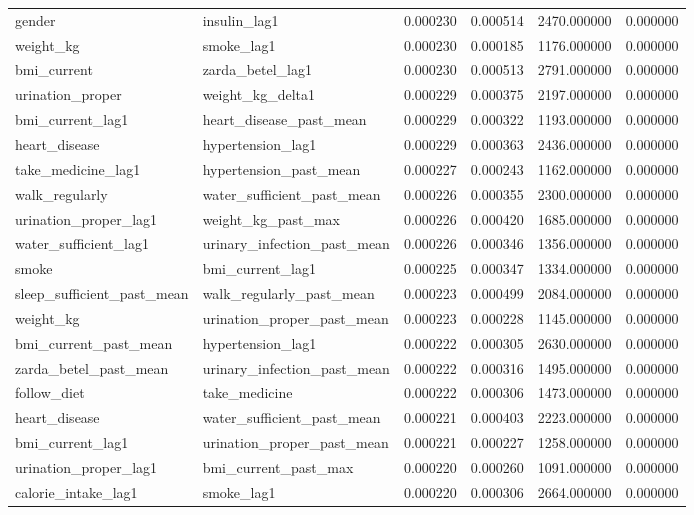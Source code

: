 \begin{longtable}{llrrrr}
gender & insulin\_lag1 & 0.000230 & 0.000514 & 2470.000000 & 0.000000 \\
weight\_kg & smoke\_lag1 & 0.000230 & 0.000185 & 1176.000000 & 0.000000 \\
bmi\_current & zarda\_betel\_lag1 & 0.000230 & 0.000513 & 2791.000000 & 0.000000 \\
urination\_proper & weight\_kg\_delta1 & 0.000229 & 0.000375 & 2197.000000 & 0.000000 \\
bmi\_current\_lag1 & heart\_disease\_past\_mean & 0.000229 & 0.000322 & 1193.000000 & 0.000000 \\
heart\_disease & hypertension\_lag1 & 0.000229 & 0.000363 & 2436.000000 & 0.000000 \\
take\_medicine\_lag1 & hypertension\_past\_mean & 0.000227 & 0.000243 & 1162.000000 & 0.000000 \\
walk\_regularly & water\_sufficient\_past\_mean & 0.000226 & 0.000355 & 2300.000000 & 0.000000 \\
urination\_proper\_lag1 & weight\_kg\_past\_max & 0.000226 & 0.000420 & 1685.000000 & 0.000000 \\
water\_sufficient\_lag1 & urinary\_infection\_past\_mean & 0.000226 & 0.000346 & 1356.000000 & 0.000000 \\
smoke & bmi\_current\_lag1 & 0.000225 & 0.000347 & 1334.000000 & 0.000000 \\
sleep\_sufficient\_past\_mean & walk\_regularly\_past\_mean & 0.000223 & 0.000499 & 2084.000000 & 0.000000 \\
weight\_kg & urination\_proper\_past\_mean & 0.000223 & 0.000228 & 1145.000000 & 0.000000 \\
bmi\_current\_past\_mean & hypertension\_lag1 & 0.000222 & 0.000305 & 2630.000000 & 0.000000 \\
zarda\_betel\_past\_mean & urinary\_infection\_past\_mean & 0.000222 & 0.000316 & 1495.000000 & 0.000000 \\
follow\_diet & take\_medicine & 0.000222 & 0.000306 & 1473.000000 & 0.000000 \\
heart\_disease & water\_sufficient\_past\_mean & 0.000221 & 0.000403 & 2223.000000 & 0.000000 \\
bmi\_current\_lag1 & urination\_proper\_past\_mean & 0.000221 & 0.000227 & 1258.000000 & 0.000000 \\
urination\_proper\_lag1 & bmi\_current\_past\_max & 0.000220 & 0.000260 & 1091.000000 & 0.000000 \\
calorie\_intake\_lag1 & smoke\_lag1 & 0.000220 & 0.000306 & 2664.000000 & 0.000000 \\

\end{longtable}

